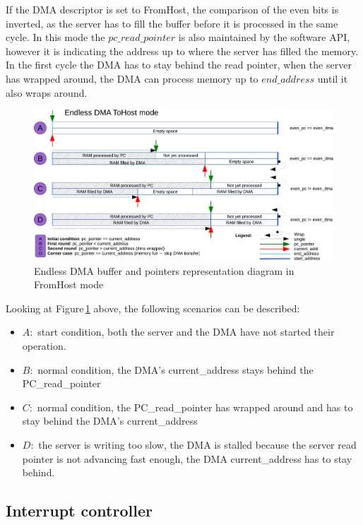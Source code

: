 \newpage
If the DMA descriptor is set to FromHost, the comparison of the even bits is inverted, as the server has to fill the buffer before it is processed in the same cycle. In this mode the $pc\_read\_pointer$ is also maintained by the software API, however it is indicating the address up to where the server has filled the memory. In the first cycle the DMA has to stay behind the read pointer, when the server has wrapped around, the DMA can process memory up to $end\_address$ until it also wraps around.

\begin{figure}[H]
	\centering
	\includegraphics[width=1\textwidth, page=2]{figures/Endless_DMA_diagram.pdf}
	\caption{Endless DMA buffer and pointers representation diagram in FromHost mode}
	\label{fig:endless_dma_diagram_fromhost}
\end{figure}
Looking at Figure\,\ref{fig:endless_dma_diagram_fromhost} above, the following scenarios can be described:
\begin{itemize}
	\item $A:$ start condition, both the server and the DMA have not started their operation.
	\item $B:$ normal condition, the DMA's current\_address stays behind the PC\_read\_pointer
	\item $C:$ normal condition, the PC\_read\_pointer has wrapped around and has to stay behind the DMA's current\_address
	\item $D:$ the server is writing too slow, the DMA is stalled because the server read pointer is not advancing fast enough, the DMA current\_address has to stay behind.
\end{itemize}

\newpage
\subsection{Interrupt controller}
\label{sec:interrupt_controller}


